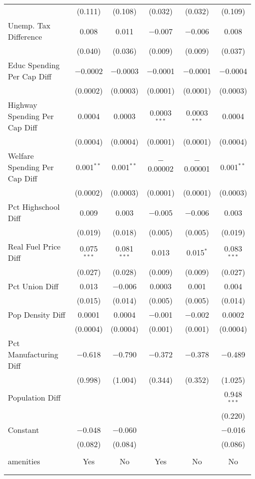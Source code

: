 \begin{table}[!htbp]
\begin{tabular}{@{\extracolsep{5pt}}lccccc}
  & (0.111) & (0.108) & (0.032) & (0.032) & (0.109) \\ 
  Unemp. Tax Difference & 0.008 & 0.011 & $-$0.007 & $-$0.006 & 0.008 \\ 
  & (0.040) & (0.036) & (0.009) & (0.009) & (0.037) \\ 
  Educ Spending Per Cap Diff & $-$0.0002 & $-$0.0003 & $-$0.0001 & $-$0.0001 & $-$0.0004 \\ 
  & (0.0002) & (0.0003) & (0.0001) & (0.0001) & (0.0003) \\ 
  Highway Spending Per Cap Diff & 0.0004 & 0.0003 & 0.0003$^{***}$ & 0.0003$^{***}$ & 0.0004 \\ 
  & (0.0004) & (0.0004) & (0.0001) & (0.0001) & (0.0004) \\ 
  Welfare Spending Per Cap Diff & 0.001$^{**}$ & 0.001$^{**}$ & $-$0.00002 & $-$0.00001 & 0.001$^{**}$ \\ 
  & (0.0002) & (0.0003) & (0.0001) & (0.0001) & (0.0003) \\ 
  Pct Highschool Diff & 0.009 & 0.003 & $-$0.005 & $-$0.006 & 0.003 \\ 
  & (0.019) & (0.018) & (0.005) & (0.005) & (0.019) \\ 
  Real Fuel Price Diff & 0.075$^{***}$ & 0.081$^{***}$ & 0.013 & 0.015$^{*}$ & 0.083$^{***}$ \\ 
  & (0.027) & (0.028) & (0.009) & (0.009) & (0.027) \\ 
  Pct Union Diff & 0.013 & $-$0.006 & 0.0003 & 0.001 & 0.004 \\ 
  & (0.015) & (0.014) & (0.005) & (0.005) & (0.014) \\ 
  Pop Density Diff & 0.0001 & 0.0004 & $-$0.001 & $-$0.002 & 0.0002 \\ 
  & (0.0004) & (0.0004) & (0.001) & (0.001) & (0.0004) \\ 
  Pct Manufacturing Diff & $-$0.618 & $-$0.790 & $-$0.372 & $-$0.378 & $-$0.489 \\ 
  & (0.998) & (1.004) & (0.344) & (0.352) & (1.025) \\ 
  Population Diff &  &  &  &  & 0.948$^{***}$ \\ 
  &  &  &  &  & (0.220) \\ 
  Constant & $-$0.048 & $-$0.060 &  &  & $-$0.016 \\ 
  & (0.082) & (0.084) &  &  & (0.086) \\ 
 \hline \\[-1.8ex] 
amenities & Yes & No & Yes & No & No \\ 
\hline \\[-1.8ex] 
\hline 
\hline \\[-1.8ex] 
\end{tabular} 
\end{table} 

